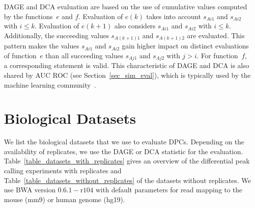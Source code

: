 DAGE and DCA evaluation are based on the use of cumulative values computed by the functions~$e$ and $f$.
Evaluation of $e(k)$ takes into account $s_{Ai1}$ and $s_{Ai2}$ with $i \leq k$.
Evaluation of $e(k+1)$ also considers $s_{Ai1}$ and $s_{Ai2}$ with $i \leq k$.
Additionally, the succeeding values $s_{A(k+1)1}$ and $s_{A(k+1)2}$ are evaluated.
This pattern makes the values $s_{Ai1}$ and $s_{Ai2}$ gain higher impact on distinct evaluations of function~$e$ than all succeeding values $s_{Aj1}$ and $s_{Aj2}$ with $j > i$.
For function~$f$, a corresponding statement is valid.
This characteristic of DAGE and DCA is also shared by AUC ROC (see Section~\ref{sec_sim_eval}), which is typically used by the machine learning community~\citep{Fawcett2004}.


\section{Biological Datasets}
\label{sec_biol_datasets}
We list the biological datasets that we use to evaluate DPCs.
Depending on the availability of replicates, we use the DAGE or DCA statistic for the evaluation.
Table~\ref{table_datasets_with_replicates} gives an overview of the differential peak calling experiments with replicates and Table~\ref{table_datasets_without_replicates} of the datasets without replicates.
We use BWA \citep{li2010} version $0.6.1-\text{r}104$ with default parameters for read mapping to the mouse (mm9) or human genome (hg19).

